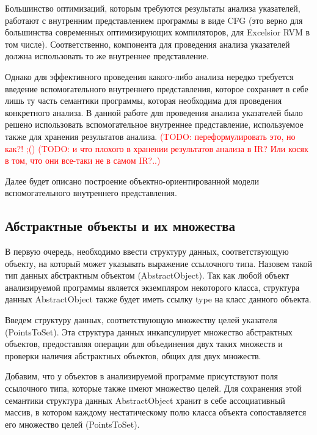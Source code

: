 \documentclass[14pt,titlepage]{extarticle}
\newcommand{\todo}[1]{\textcolor{red}{(\eng{TODO}: #1)}}
\newcommand{\eng}[1]{{\English#1}}
\begin{document}
    Большинство оптимизаций, которым требуются результаты анализа указателей,
    работают с внутренним представлением программы в виде CFG (это верно для
    большинства современных оптимизирующих компиляторов, для \eng{Excelsior}
    RVM в том числе). Соответственно, компонента для проведения анализа
    указателей должна использовать то же внутреннее представление.

    Однако для эффективного проведения какого-либо анализа нередко требуется
    введение вспомогательного внутреннего представления, которое сохраняет в
    себе лишь ту часть семантики программы, которая необходима для проведения
    конкретного анализа. В данной работе для проведения анализа указателей было
    решено использовать вспомогательное внутреннее представление, используемое
    также для хранения результатов анализа.
    \todo{переформулировать это, но как?! ;(}
    \todo{и что плохого в хранении результатов анализа в IR?
          Или косяк в том, что они все-таки не в самом IR?..}

    Далее будет описано построение объектно-ориентированной модели
    вспомогательного внутреннего представления.

    \subsection{Абстрактные объекты и их множества}

      В первую очередь, необходимо ввести структуру данных, соответствующую
      объекту, на который может указывать выражение ссылочного типа. Назовем
      такой тип данных абстрактным объектом (\eng{AbstractObject}). Так как
      любой объект анализируемой программы является экземпляром некоторого
      класса, структура данных \eng{AbstractObject} также будет иметь ссылку
      \eng{type} на класс данного объекта.

      Введем структуру данных, соответствующую множеству целей указателя
      (\eng{Points\-To\-Set}). Эта структура данных инкапсулирует
      множество абстрактных объектов, предоставляя операции для объединения двух
      таких множеств и проверки наличия абстрактных объектов, общих для двух
      множеств.

      Добавим, что у объектов в анализируемой программе присутствуют поля
      ссылочного типа, которые также имеют множество целей. Для сохранения
      этой семантики структура данных \eng{AbstractObject} хранит в себе
      ассоциативный массив, в котором каждому нестатическому полю класса объекта
      сопоставляется его множество целей (\eng{PointsToSet}).
\end{document}
